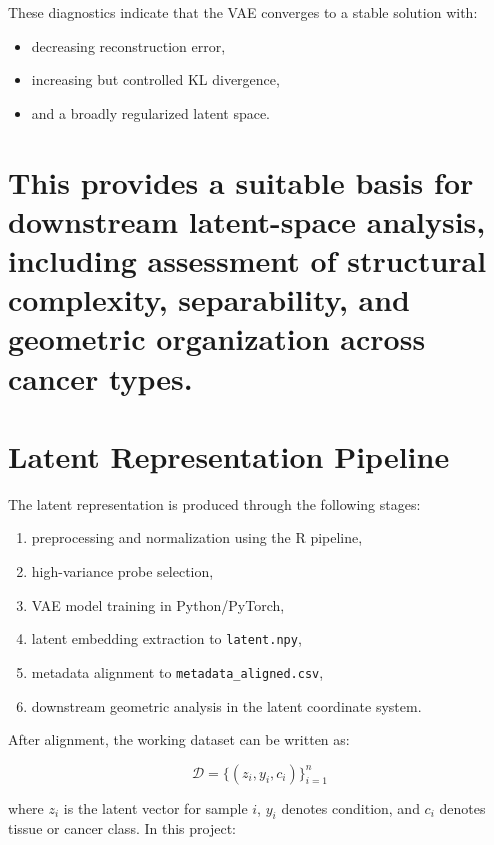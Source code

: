 \documentclass[
  letterpaper,
  DIV=11,
  numbers=noendperiod,
  openany,
  oneside]{scrreprt}
\providecommand{\tightlist}{%
  \setlength{\itemsep}{0pt}\setlength{\parskip}{0pt}}
\begin{document}
These diagnostics indicate that the VAE converges to a stable solution
with:

\begin{itemize}
\tightlist
\item
  decreasing reconstruction error,
\item
  increasing but controlled KL divergence,
\item
  and a broadly regularized latent space.
\end{itemize}

\section{This provides a suitable basis for downstream latent-space
analysis, including assessment of structural complexity, separability,
and geometric organization across cancer
types.}\label{this-provides-a-suitable-basis-for-downstream-latent-space-analysis-including-assessment-of-structural-complexity-separability-and-geometric-organization-across-cancer-types.}

\section{Latent Representation
Pipeline}\label{latent-representation-pipeline}

The latent representation is produced through the following stages:

\begin{enumerate}
\def\labelenumi{\arabic{enumi}.}
\tightlist
\item
  preprocessing and normalization using the R pipeline,
\item
  high-variance probe selection,
\item
  VAE model training in Python/PyTorch,
\item
  latent embedding extraction to \texttt{latent.npy},
\item
  metadata alignment to \texttt{metadata\_aligned.csv},
\item
  downstream geometric analysis in the latent coordinate system.
\end{enumerate}

After alignment, the working dataset can be written as:

\[
\mathcal{D} = \{(z_i, y_i, c_i)\}_{i=1}^{n}
\]

where \(z_i\) is the latent vector for sample \(i\), \(y_i\) denotes
condition, and \(c_i\) denotes tissue or cancer class. In this project:
\end{document}
